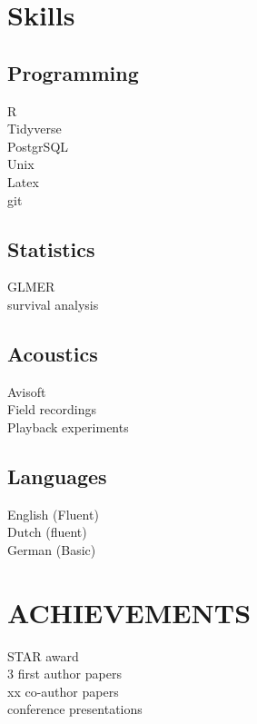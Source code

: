 \documentclass[letterpaper]{deedy-resume} %
\begin{document}
\begin{minipage}[t]{0.33\textwidth} %


\section{Skills}
\subsection{Programming}
R\\
Tidyverse\\
PostgrSQL\\
Unix\\
Latex\\
git\\

\sectionspace %
\subsection{Statistics}
GLMER \\
survival analysis\\

\subsection{Acoustics}
Avisoft\\
Field recordings\\
Playback experiments

\sectionspace %

\sectionspace %
\subsection{Languages}

English (Fluent)\\
Dutch (fluent)\\
German (Basic)\\


\sectionspace %

\section{ACHIEVEMENTS}
STAR award\\
3 first author papers\\
xx co-author papers\\
conference presentations\\


\end{minipage} %
\end{document}
